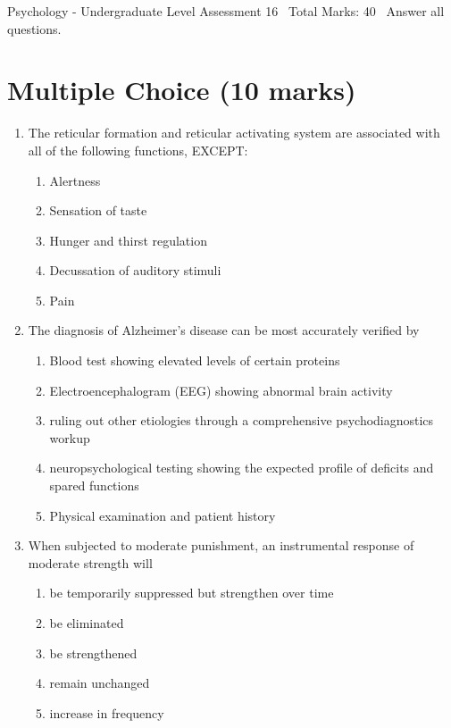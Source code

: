 \documentclass[12pt]{article}
\begin{document}
\begin{center}
Psychology - Undergraduate Level Assessment 16 \
Total Marks: 40 \
Answer all questions.
\end{center}

\section*{Multiple Choice (10 marks)}
\begin{enumerate}[label=\arabic*.]
\item The reticular formation and reticular activating system are associated with all of the following functions, EXCEPT:
\begin{enumerate}[label=(\alph*)]
    \item Alertness
    \item Sensation of taste
    \item Hunger and thirst regulation
    \item Decussation of auditory stimuli
    \item Pain
\end{enumerate}
\item The diagnosis of Alzheimer's disease can be most accurately verified by
\begin{enumerate}[label=(\alph*)]
    \item Blood test showing elevated levels of certain proteins
    \item Electroencephalogram (EEG) showing abnormal brain activity
    \item ruling out other etiologies through a comprehensive psychodiagnostics workup
    \item neuropsychological testing showing the expected profile of deficits and spared functions
    \item Physical examination and patient history
\end{enumerate}
\item When subjected to moderate punishment, an instrumental response of moderate strength will
\begin{enumerate}[label=(\alph*)]
    \item be temporarily suppressed but strengthen over time
    \item be eliminated
    \item be strengthened
    \item remain unchanged
    \item increase in frequency
\end{enumerate}

\end{enumerate}
\end{document}
